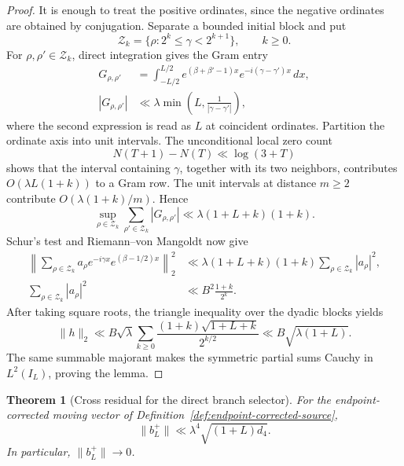 \documentclass[11pt]{amsart}
\newtheorem{theorem}{Theorem}[section]
\theoremstyle{definition}
\theoremstyle{remark}
\begin{document}
\begin{proof}
It is enough to treat the positive ordinates, since the negative ordinates
are obtained by conjugation.  Separate a bounded initial block and put
\[
 \mathcal Z_k=\{\rho:2^k\le\gamma<2^{k+1}\},
 \qquad k\ge0.
\tag{8.8ai}
\]
For \(\rho,\rho'\in\mathcal Z_k\), direct integration gives the Gram
entry
\[
 \begin{aligned}
 G_{\rho,\rho'}
 &=\int_{-L/2}^{L/2}
 e^{(\beta+\beta'-1)x}e^{-i(\gamma-\gamma')x}\,dx,\\
 |G_{\rho,\rho'}|
 &\ll\lambda\min\!\left(L,
 \frac1{|\gamma-\gamma'|}\right),
 \end{aligned}
\tag{8.8aj}
\]
where the second expression is read as \(L\) at coincident ordinates.
Partition the ordinate axis into unit intervals.  The unconditional local
zero count
\[
 N(T+1)-N(T)\ll\log(3+T)
\tag{8.8ak}
\]
shows that the interval containing \(\gamma\), together with its two
neighbors, contributes \(O(\lambda L(1+k))\) to a Gram row.  The unit
intervals at distance \(m\ge2\) contribute
\(O(\lambda(1+k)/m)\).  Hence
\[
 \sup_{\rho\in\mathcal Z_k}
 \sum_{\rho'\in\mathcal Z_k}|G_{\rho,\rho'}|
 \ll\lambda(1+L+k)(1+k).
\tag{8.8al}
\]
Schur's test and Riemann--von Mangoldt now give
\[
 \begin{aligned}
 \left\|\sum_{\rho\in\mathcal Z_k}a_\rho
 e^{-i\gamma x}e^{(\beta-1/2)x}\right\|_2^2
 &\ll\lambda(1+L+k)(1+k)
       \sum_{\rho\in\mathcal Z_k}|a_\rho|^2,\\
 \sum_{\rho\in\mathcal Z_k}|a_\rho|^2
 &\ll B^2\frac{1+k}{2^k}.
 \end{aligned}
\tag{8.8am}
\]
After taking square roots, the triangle inequality over the dyadic blocks
yields
\[
 \|h\|_2
 \ll B\sqrt\lambda
 \sum_{k\ge0}
 \frac{(1+k)\sqrt{1+L+k}}{2^{k/2}}
 \ll B\sqrt{\lambda(1+L)}.
\tag{8.8an}
\]
The same summable majorant makes the symmetric partial sums Cauchy in
\(L^2(I_L)\), proving the lemma.
\end{proof}

\begin{theorem}[Cross residual for the direct branch selector]
\label{thm:cross-residual-vanishing}
For the endpoint-corrected moving vector of
Definition~\ref{def:endpoint-corrected-source},
\[
 \boxed{
 \|b_L^+\|
 \ll\lambda^4\sqrt{(1+L)d_4}.}
\tag{8.8ao}
\]
In particular, \(\|b_L^+\|\to0\).
\end{theorem}
\end{document}
